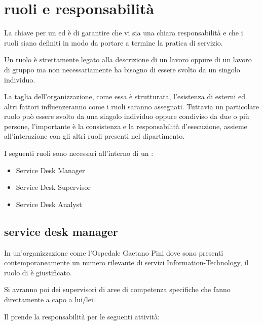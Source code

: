 %
%
\section[Ruoli e responsabilità]{ruoli e responsabilità}
\label{sd-roles-responsabilities}
La chiave per un   ed  è di garantire che vi sia una chiara responsabilità e che i ruoli siano definiti in modo da portare a termine la pratica di servizio. 

Un ruolo è strettamente legato alla descrizione di un lavoro oppure di un lavoro di gruppo ma non necessariamente ha bisogno di essere svolto da un singolo individuo.

La taglia dell'organizzazione, come essa è strutturata, l'esistenza di  esterni ed altri fattori influenzeranno come i ruoli saranno assegnati. Tuttavia un particolare ruolo può essere svolto da una singolo individuo oppure condiviso da due o più persone, l'importante è la consistenza e la responsabilità d'esecuzione, assieme all'interazione con gli altri ruoli presenti nel dipartimento.

I seguenti ruoli sono necessari all'interno di un :

\begin{itemize}
\item{Service Desk Manager}
\item{Service Desk Supervisor}
\item{Service Desk Analyst}
\end{itemize}

\subsection[Service Desk Manager]{service desk manager}
\label{sd-sd-manger}
In un'organizzazione come l'Ospedale Gaetano Pini dove sono presenti contemporaneamente un numero rilevante di servizi \acs{Information-Technology}, il ruolo di  è giustificato.

Si avranno poi dei supervisori di aree di competenza specifiche che fanno direttamente a capo a lui/lei.

Il  prende la responsabilità per le seguenti attività:


